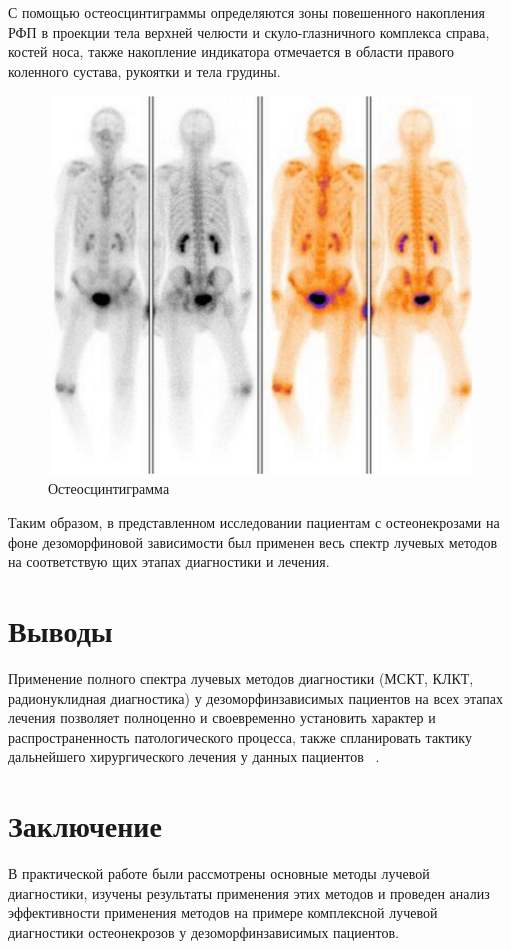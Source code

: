 \documentclass[11pt]{article}
\begin{document}
	С помощью остеосцинтиграммы определяются зоны повешенного накопления РФП в проекции тела верхней челюсти и скуло-глазничного комплекса справа, костей носа, также накопление индикатора отмечается в области правого коленного сустава, рукоятки и тела грудины. 
	
	\begin{figure}[H]
		\centering
		\includegraphics[width=\textwidth]{gk3}
		\caption{ Остеосцинтиграмма ~\cite{rejr} }
		\label{fig:gk3}
	\end{figure} 

	Таким образом, в представленном исследовании пациентам с остеонекрозами на фоне дезоморфиновой зависимости был применен весь спектр лучевых методов на соответствую	щих этапах диагностики и лечения. 

	
	\section{Выводы}
	 Применение полного спектра лучевых методов диагностики (МСКТ,	КЛКТ, радионуклидная диагностика) у дезоморфинзависимых пациентов на всех этапах лечения позволяет полноценно и своевременно установить характер и распространенность патологического процесса, также спланировать тактику дальнейшего хирургического лечения у данных пациентов ~\cite{rejr}. 
	
	\section{Заключение}
	В практической работе были рассмотрены основные методы лучевой диагностики, изучены результаты применения этих методов и проведен анализ эффективности применения методов на примере комплексной лучевой диагностики остеонекрозов у дезоморфинзависимых пациентов.
	
\end{document}
